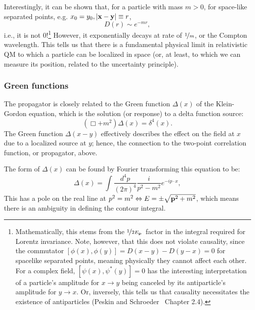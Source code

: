 Interestingly, it can be shown that, for a particle with mass $m > 0$, for space-like separated points, e.g. $x_0 = y_0, \left\lvert \mathbf{x} - \mathbf{y} \right\rvert \equiv r$, 
\begin{equation}
	\label{eq:01_qft_quantization_propagator_spacelike}
	D(r) \sim e^{-mr},
\end{equation}
i.e., it is not 0!\footnote{Mathematically, this stems from the $\cnicefrac{1}{2\svecp E}$ factor in the integral required for Lorentz invariance.
Note, however, that this does not violate causality, since the commutator $[\phi(x), \phi(y)] = D(x- y) - D(y-x) = 0$ for spacelike separated points, meaning physically they cannot affect each other.
For a complex field, $[\psi(x), \psi^*(y)] = 0$ has the interesting interpretation of a particle's amplitude for $x \rightarrow y$ being canceled by its antiparticle's amplitude for $y \rightarrow x$.
Or, inversely, this tells us that causality necessitates the existence of antiparticles (Peskin and Schroeder~\cite{Peskin:1995ev} Chapter 2.4).}
However, it exponentially decays at rate of $\cnicefrac{1}{m}$, or the Compton wavelength.
This tells us that there is a fundamental physical limit in relativistic QM to which a particle can be localized in space (or, at least, to which we can measure its position, related to the uncertainty principle).

\subsubsection{Green functions}

The propagator is closely related to the Green function $\Delta(x)$ of the Klein-Gordon equation, which is the solution (or response) to a delta function source:
\begin{equation}
    \label{eq:01_qft_quantization_green_function}
    (\Box + m^2)\Delta(x) = \delta^4(x).
\end{equation}
The Green function $\Delta(x - y)$ effectively describes the effect on the field at $x$ due to a localized source at $y$; hence, the connection to the two-point correlation function, or propagator, above.

The form of $\Delta(x)$ can be found by Fourier transforming this equation to be:
\begin{equation}
    \label{eq:01_qft_quantization_propagator_fourier}
    \Delta(x) = \int \frac{d^4p}{(2\pi)^4} \frac{i}{p^2 - m^2} e^{-ip\cdot x},
\end{equation}
This has a pole on the real line at $p^2 = m^2 \Leftrightarrow E = \pm \sqrt{\mathbf{p}^2 + m^2}$, which means there is an ambiguity in defining the contour integral.

